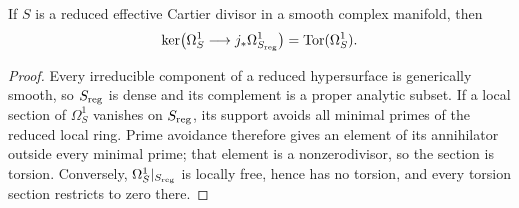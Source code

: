\begin{lemma}
\hypertarget{tag-03IF}{}\label{wbII:lem:torsion-identification}

If $S$ is a reduced effective Cartier divisor in a smooth complex manifold,
then
\[
\ker\bigl(\Omega^1_S\longrightarrow j_*\Omega^1_{S_{\rm reg}}\bigr)
  =\operatorname{Tor}(\Omega^1_S).
\]
\end{lemma}



\begin{proof}
Every irreducible component of a reduced hypersurface is generically smooth,
so $S_{\rm reg}$ is dense and its complement is a proper analytic subset.
If a local section of $\Omega^1_S$ vanishes on $S_{\rm reg}$, its support avoids
all minimal primes of the reduced local ring.  Prime avoidance therefore gives
an element of its annihilator outside every minimal prime; that element is a
nonzerodivisor, so the section is torsion.  Conversely,
$\Omega^1_S|_{S_{\rm reg}}$ is locally free, hence has no torsion, and every
torsion section restricts to zero there.

\end{proof}
